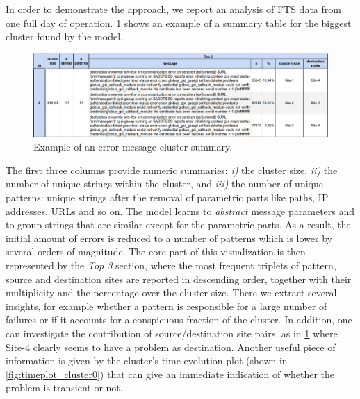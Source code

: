 In order to demonstrate the approach, we report an analysis of FTS data from one full day of operation. %
\cref{fig:cluster0} shows an example of a summary table for the biggest cluster found by the model.
\begin{figure}[t]
    \centering
    \includegraphics[width=\textwidth]{figures/410_method/cluster0_wide.png}
    \caption{
    Example of an error message cluster summary.}
    \label{fig:cluster0}
\end{figure}
The first three columns provide numeric summaries: \textit{i)} the cluster size, \textit{ii)} the number of unique strings within the cluster, and \textit{iii)} the number of unique patterns: unique strings after the removal of parametric parts like paths, IP addresses, URLs and so on. The model learns to \textit{abstract} message parameters and to group strings that are similar except for the parametric parts. As a result, the initial amount of errors is reduced to a number of patterns which is lower by several orders of magnitude. 
The core part of this visualization is then represented by the \textit{Top 3} section, where the most frequent triplets of pattern, source and destination sites are reported in descending order, together with their multiplicity and the percentage over the cluster size.
There we extract several insights, for example whether a pattern is responsible for a large number of failures or if it accounts for a conspicuous fraction of the cluster. In addition, one can investigate the contribution of source/destination site pairs, 
as in \cref{fig:cluster0} where Site-4 clearly seems to have a problem as destination. 
%
Another useful piece of information is given by the cluster's time evolution plot (shown in \cref{fig:timeplot_cluster0}) that can give an immediate indication of whether the problem  is transient or not. 

